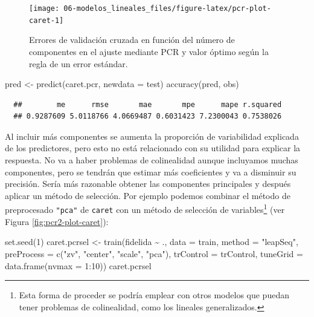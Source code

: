 \documentclass[
]{book}
\newenvironment{Shaded}{\begin{snugshade}}{\end{snugshade}}
\newcommand{\AttributeTok}[1]{\textcolor[rgb]{0.77,0.63,0.00}{#1}}
\newcommand{\DecValTok}[1]{\textcolor[rgb]{0.00,0.00,0.81}{#1}}
\newcommand{\FunctionTok}[1]{\textcolor[rgb]{0.00,0.00,0.00}{#1}}
\newcommand{\NormalTok}[1]{#1}
\newcommand{\OtherTok}[1]{\textcolor[rgb]{0.56,0.35,0.01}{#1}}
\newcommand{\SpecialCharTok}[1]{\textcolor[rgb]{0.00,0.00,0.00}{#1}}
\newcommand{\StringTok}[1]{\textcolor[rgb]{0.31,0.60,0.02}{#1}}
\theoremstyle{break}
\theoremstyle{nonumberplain}
\begin{document}
\begin{figure}[!htb]

{\centering \texttt{[image: 06-modelos\_lineales\_files/figure-latex/pcr-plot-caret-1]} 

}

\caption{Errores de validación cruzada en función del número de componentes en el ajuste mediante PCR y valor óptimo según la regla de un error estándar.}\label{fig:pcr-plot-caret}
\end{figure}

\begin{Shaded}
\begin{Highlighting}[]
\NormalTok{pred }\OtherTok{\textless{}{-}} \FunctionTok{predict}\NormalTok{(caret.pcr, }\AttributeTok{newdata =}\NormalTok{ test)}
\FunctionTok{accuracy}\NormalTok{(pred, obs)}
\end{Highlighting}
\end{Shaded}

\begin{verbatim}
  ##        me      rmse       mae       mpe      mape r.squared 
  ## 0.9287609 5.0118766 4.0669487 0.6031423 7.2300043 0.7538026
\end{verbatim}

Al incluir más componentes se aumenta la proporción de variabilidad explicada de los predictores,
pero esto no está relacionado con su utilidad para explicar la respuesta.
No va a haber problemas de colinealidad aunque incluyamos muchas componentes, pero se tendrán que estimar más coeficientes y va a disminuir su precisión.
Sería más razonable obtener las componentes principales y después aplicar un método de selección.
Por ejemplo podemos combinar el método de preprocesado \texttt{"pca"} de \texttt{caret} con un método de selección de variables\footnote{Esta forma de proceder se podría emplear con otros modelos que puedan tener problemas de colinealidad, como los lineales generalizados.} (ver Figura \ref{fig:pcr2-plot-caret}):

\begin{Shaded}
\begin{Highlighting}[]
\FunctionTok{set.seed}\NormalTok{(}\DecValTok{1}\NormalTok{)}
\NormalTok{caret.pcrsel }\OtherTok{\textless{}{-}} \FunctionTok{train}\NormalTok{(fidelida }\SpecialCharTok{\textasciitilde{}}\NormalTok{ ., }\AttributeTok{data =}\NormalTok{ train, }\AttributeTok{method =} \StringTok{"leapSeq"}\NormalTok{,}
                   \AttributeTok{preProcess =} \FunctionTok{c}\NormalTok{(}\StringTok{"zv"}\NormalTok{, }\StringTok{"center"}\NormalTok{, }\StringTok{"scale"}\NormalTok{, }\StringTok{"pca"}\NormalTok{),     }
                   \AttributeTok{trControl =}\NormalTok{ trControl, }\AttributeTok{tuneGrid =} \FunctionTok{data.frame}\NormalTok{(}\AttributeTok{nvmax =} \DecValTok{1}\SpecialCharTok{:}\DecValTok{10}\NormalTok{))}
\NormalTok{caret.pcrsel}
\end{Highlighting}
\end{Shaded}
\end{document}
